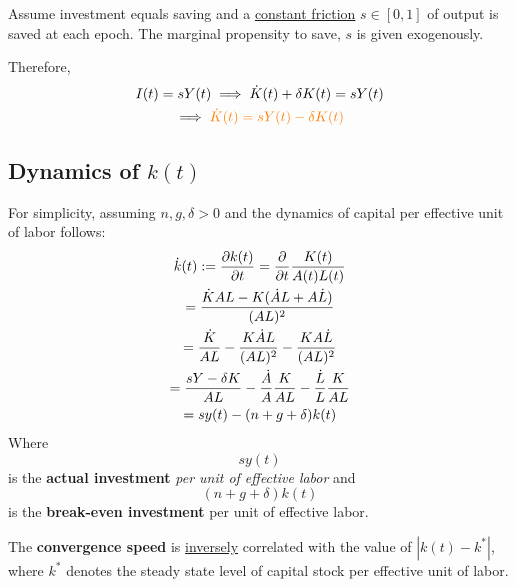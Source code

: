 \documentclass[11pt]{article}
\begin{document}
			\begin{assumption}
				Assume investment equals saving and a \ul{constant friction} $s \in [0, 1]$ of output is saved at each epoch. The marginal propensity to save, $s$ is given exogenously.
			\end{assumption}
			
			\par Therefore,
			\begin{gather}
				I(t) = sY(t) \implies \dot{K}(t) + \delta K(t) = sY(t) \\
				\implies \textcolor{orange}{
					\dot{K}(t) = sY(t) - \delta K(t)
					}
			\end{gather}
			
			\subsection{Dynamics of $k(t)$}
				\par For simplicity, assuming $n, g, \delta > 0$ and the dynamics of capital per effective unit of labor follows: 
				\begin{gather}
					\dot{k}(t) := \frac{\partial{k(t)}}{\partial{t}} = \frac{\partial{}}{\partial{t}} \frac{K(t)}{A(t)L(t)} \\
					= \frac{\dot{K}AL - K(\dot{A}L + A\dot{L})}{(AL)^2} \\
					= \frac{\dot{K}}{AL} - \frac{K\dot{A}L}{(AL)^2} - \frac{K A\dot{L}}{(AL)^2} \\
					= \frac{sY - \delta K}{AL} - \frac{\dot{A}}{A}\frac{K}{AL} - \frac{\dot{L}}{L} \frac{K}{AL} \\
					= sy(t) - (n + g + \delta) k(t)
				\end{gather}
				Where \[s y(t)\] is the \textbf{actual investment} \emph{per unit of effective labor} and \[(n + g + \delta) k(t)\] is the \textbf{break-even investment} per unit of effective labor.
				
				\begin{remark}
					The \textbf{convergence speed} is \ul{inversely} correlated with the value of $| k(t) - k^* |$, where $k^*$ denotes the steady state level of capital stock per effective unit of labor.
				\end{remark}
				
\end{document}
